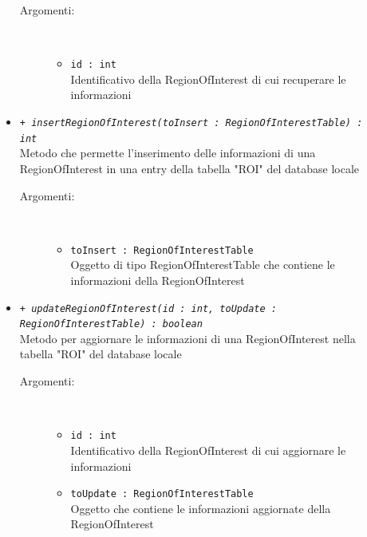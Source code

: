 \documentclass[../DefinizioneDiProdotto.tex]{subfiles}
\begin{document}
\begin{description}
\begin{itemize}
		\begin{description}
			\item[Argomenti:] \
			\begin{itemize}
				\item \texttt{id : int}\\
				Identificativo della RegionOfInterest di cui recuperare le informazioni\end{itemize}
		\end{description}
		\item \texttt{+ \textit{insertRegionOfInterest(toInsert : RegionOfInterestTable) : int}}\\
		Metodo che permette l'inserimento delle informazioni di una RegionOfInterest in una entry della tabella "ROI" del database locale
		\begin{description}
			\item[Argomenti:] \
			\begin{itemize}
				\item \texttt{toInsert : RegionOfInterestTable}\\
				Oggetto di tipo RegionOfInterestTable che contiene le informazioni della RegionOfInterest\end{itemize}
		\end{description}
		\item \texttt{+ \textit{updateRegionOfInterest(id : int, toUpdate : RegionOfInterestTable) : boolean}}\\
		Metodo per aggiornare le informazioni di una RegionOfInterest nella tabella "ROI" del database locale
		\begin{description}
			\item[Argomenti:] \
			\begin{itemize}
				\item \texttt{id : int}\\
				Identificativo della RegionOfInterest di cui aggiornare le informazioni\item \texttt{toUpdate : RegionOfInterestTable}\\
				Oggetto che contiene le informazioni aggiornate della RegionOfInterest\end{itemize}
		\end{description}
	\end{itemize}
\end{description}
\end{document}
